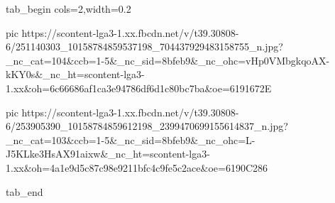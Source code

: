 \ifcmt
  tab_begin cols=2,width=0.2

     pic https://scontent-lga3-1.xx.fbcdn.net/v/t39.30808-6/251140303_10158784859537198_704437929483158755_n.jpg?_nc_cat=104&ccb=1-5&_nc_sid=8bfeb9&_nc_ohc=vHp0VMbgkqoAX-kKY0s&_nc_ht=scontent-lga3-1.xx&oh=6c66686af1ca3e94786df6d1c80bc7ba&oe=6191672E

     pic https://scontent-lga3-1.xx.fbcdn.net/v/t39.30808-6/253905390_10158784859612198_2399470699155614837_n.jpg?_nc_cat=103&ccb=1-5&_nc_sid=8bfeb9&_nc_ohc=L-J5KLke3HsAX91aixw&_nc_ht=scontent-lga3-1.xx&oh=4a1e9d5c87c98e9211bfc4c9fe5c2ace&oe=6190C286

  tab_end
\fi
